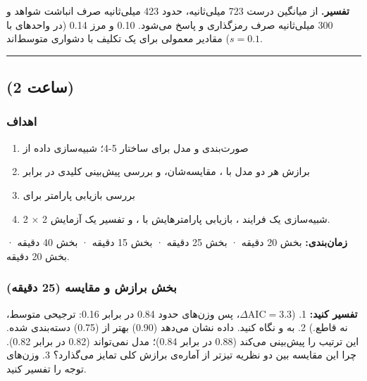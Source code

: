 \textbf{تفسیر.} از میانگین  درست 723 میلی‌ثانیه، حدود 423
میلی‌ثانیه صرف انباشت شواهد و 300 میلی‌ثانیه صرف رمزگذاری و پاسخ می‌شود.
 0.10 و مرز 0.14 (در واحدهای  با \(s = 0.1\)) مقادیر
معمولی برای یک تکلیف با دشواری متوسط‌اند.

\begin{center}\rule{0.5\linewidth}{0.5pt}\end{center}


\subsection{\texorpdfstring{ (2 ساعت)}{lab (2 ساعت)}}

\subsubsection{اهداف}

\begin{enumerate}
\def\labelenumi{\arabic{enumi}.}
\tightlist
\item
  صورت‌بندی  و مدل  برای ساختار 5-4؛ شبیه‌سازی داده
  از 
\item
  برازش هر دو مدل با ، مقایسه‌شان، و بررسی پیش‌بینی کلیدی 
  در برابر 
\item
  بررسی بازیابی پارامتر برای 
\item
  شبیه‌سازی یک فرایند ، بازیابی پارامترهایش با
  ، و تفسیر یک آزمایش 2 × 2.
\end{enumerate}

\textbf{زمان‌بندی:} بخش  20 دقیقه · بخش  25 دقیقه · بخش
 15 دقیقه · بخش  40 دقیقه · بخش  20 دقیقه.

\subsubsection{\texorpdfstring{بخش  برازش و مقایسه (25
دقیقه)}{بخش B: برازش و مقایسه (25 دقیقه)}}

\textbf{تفسیر کنید:} 1. (\(\Delta\mathrm{AIC} = 3.3\)، پس وزن‌های
 حدود 0.84 در برابر 0.16: ترجیحی متوسط، نه قاطع.) 2. به
 و  نگاه کنید. داده نشان می‌دهد  (0.90) بهتر از
 (0.75) دسته‌بندی شده.  این ترتیب را پیش‌بینی می‌کند (0.88
در برابر 0.84)؛ مدل  نمی‌تواند (0.82 در برابر 0.82). چرا
این مقایسه بین دو نظریه تیزتر از آماره‌ی برازش کلی تمایز می‌گذارد؟ 3.
وزن‌های توجه  را تفسیر کنید.

